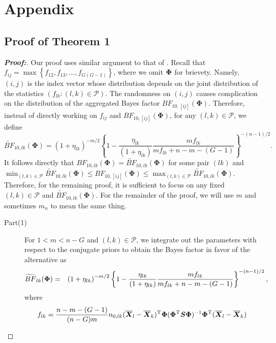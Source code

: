 \documentclass[times,sort&compress,3p]{elsarticle}
\theoremstyle{plain}%
\theoremstyle{definition}
\def\bse{\begin{eqnarray*}}
\def\ese{\end{eqnarray*}}
\def\be{\begin{eqnarray}}
\def\ee{\end{eqnarray}}
\def\trans{^{\rm T}}
\newcommand{\uS}       {\mbox{\boldmath$S$}}
\newcommand{\uX}       {\mbox{\boldmath$X$}}
\newcommand{\uPhi}              {\mbox{\boldmath$\Phi$}}
\begin{document}
\section*{Appendix}
\subsection*{Proof of Theorem 1}
\begin{proof}[\textbf{\upshape Proof:}]
Our proof uses similar argument to that of \cite{zoh2018powerful}. 
Recall that $f_{ij} = \max\left\{f_{12}, f_{13}, \ldots, f_{G(G-1)} \right\}$, where we omit $\uPhi$ for brievety. Namely, $(i, j)$ is the index vector whose distribution depends on the joint distribution of the statistics $(f_{lk}:(l, k)\in\mathcal{P})$. The randomness on $(i, j)$ causes complication on the distribution of the aggregated Bayes factor $BF_{10,[ij]}(\mathbf{\Phi})$. 
Therefore, instead of directly working on $f_{ij}$ and $BF_{10, [ij]}(\mathbf{\Phi})$, for any $(l, k)\in\mathcal{P}$, we define 
\[
\widetilde{BF}_{10,lk}(\mathbf{\Phi}) = \left(1 + \eta_{lk} \right)^{-m/2} \left\{ 1 - \frac{\eta_{lk}}{(1 + \eta_{lk})}\frac{ m f_{lk}}{ m f_{lk}  + n - m - (G-1)} \right\}^{-(n-1)/2}.
\]
It follows directly that $BF_{10,lk}(\mathbf{\Phi}) = \widetilde{BF}_{10,lk}(\mathbf{\Phi})$ for some pair $(lk)$ and $\min_{(l,k)\in\mathcal{P}}\widetilde{BF}_{10,lk}(\mathbf{\Phi})\leq BF_{10, [ij]}(\mathbf{\Phi})\leq \max_{(l,k)\in\mathcal{P}}\widetilde{BF}_{10,lk}(\mathbf{\Phi})$. Therefore, for the remaining proof, it is sufficient to focus on any fixed $(l, k)\in\mathcal{P}$ and $\widetilde{BF}_{10, lk}(\mathbf{\Phi})$. For the remainder of the proof, we will use $m$ and sometimes $m_n$ to mean the same thing. 
\begin{description}
\item[Part(1)]
For $1 < m < n - G$ and 
$(l, k)\in\mathcal{P}$,
we integrate out the parameters with respect to the conjugate priors to obtain the Bayes factor in favor of the alternative as
\be
\widetilde{BF}_{lk}(\uPhi) &=&
\left(1 + \eta_{lk} \right)^{-m/2} \left\{ 1 - \frac{\eta_{lk}}{(1 + \eta_{lk})}\frac{ m f_{lk}}{ m f_{lk}  + n - m - (G-1)} \right\}^{-(n-1)/2} 
\nonumber,
\ee
where
\bse
f_{lk}  = \frac{n - m - (G-1)}{(n-G)m} n_{0,lk}(\overline{\uX}_l - \overline{\uX}_k)\trans \uPhi(\uPhi\trans \uS\uPhi )^{-1}\uPhi\trans (\overline{\uX}_l - \overline{\uX}_k)
\ese

\end{description}
\end{proof}
\end{document}
